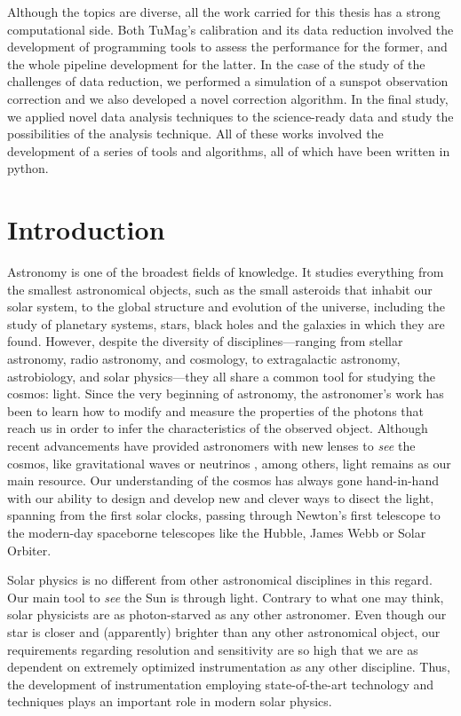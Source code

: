 Although the topics are diverse, all the work carried for this thesis has a strong computational side. Both TuMag's calibration and its data reduction involved the development of programming tools to assess the performance for the former, and the whole pipeline development for the latter. In the case of the study of the challenges of data reduction, we performed a simulation of a sunspot observation correction and we also developed a novel correction algorithm. In the final study, we applied novel data analysis techniques to the science-ready data and study the possibilities of the analysis technique. All of these works involved the development of a series of tools and algorithms, all of which have been written in python.

\section{Introduction}

Astronomy is one of the broadest fields of knowledge. It studies everything from the smallest astronomical objects, such as the small asteroids that inhabit our solar system, to the global structure and evolution of the universe, including the study of planetary systems, stars, black holes and the galaxies in which they are found. However, despite the diversity of disciplines—ranging from stellar astronomy, radio astronomy, and cosmology, to extragalactic astronomy, astrobiology, and solar physics—they all share a common tool for studying the cosmos: light. Since the very beginning of astronomy, the astronomer's work has been to learn how to modify and measure the properties of the photons that reach us in order to infer the characteristics of the observed object. Although recent advancements have provided astronomers with new lenses to \textit{see} the cosmos, like gravitational waves \citep{gravitational_waves} or neutrinos \citep{neutrinos}, among others, light remains as our main resource. Our understanding of the cosmos has always gone hand-in-hand with our ability to design and develop new and clever ways to disect the light, spanning from the first solar clocks, passing through Newton's first telescope to the modern-day spaceborne telescopes like the Hubble, James Webb or Solar Orbiter. 

Solar physics is no different from other astronomical disciplines in this regard. Our main tool to \textit{see} the Sun is through light. Contrary to what one may think, solar physicists are as photon-starved as any other astronomer. Even though our star is closer and (apparently) brighter than any other astronomical object, our requirements regarding resolution and sensitivity are so high that we are as dependent on extremely optimized instrumentation as any other discipline. Thus, the development of instrumentation employing state-of-the-art technology and techniques plays an important role in modern solar physics.

